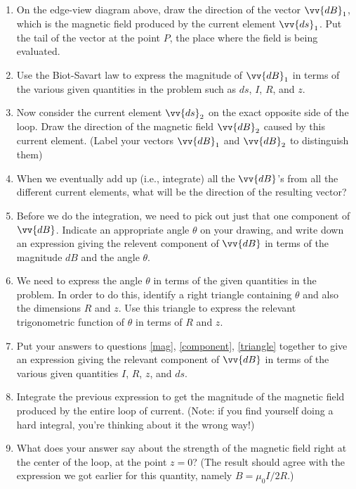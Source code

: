 \begin{enumerate}[wide, label=(\emph{\alph*})]
\item On the edge-view diagram above, draw the direction of the vector $\vv{dB}_1$,
which is the magnetic field produced by the current element $\vv{ds}_1$.  Put the
tail of the vector at the point $P$, the place where the field
is being evaluated.  

\item \label{mag}
Use the Biot-Savart law to express the magnitude of $\vv{dB}_1$
in terms of the various given quantities in the problem such as $ds$, $I$,
$R$, and $z$.
\answerspace{0.7in}

\item Now consider the current element $\vv{ds}_2$ on the exact opposite
side of the loop.  Draw the direction of the magnetic field $\vv{dB}_2$
caused by this current element.  (Label your vectors $\vv{dB}_1$ and $\vv{dB}_2$ 
to distinguish them)

\item When we eventually add up (i.e., integrate) all the $\vv{dB}$'s from
all the different current elements, what will be the direction of  
the resulting
vector?
\answerspace{0.5in}

\item \label{component}
Before we do the integration, we need to pick out just that
one component of $\vv{dB}$.  Indicate an appropriate angle $\theta$
on your drawing, and write down an expression giving the
relevent component of $\vv{dB}$ in terms of the magnitude
$dB$ and the angle $\theta$.
\answerspace{0.5in}

\item \label{triangle}
We need to express the angle $\theta$ in terms of the given
quantities in the problem.  In order to do this, identify a right
triangle containing $\theta$ and also the dimensions $R$ and $z$.  Use this triangle
to express the relevant trigonometric function of $\theta$
in terms of $R$ and $z$.  
\answerspace{0.5in}

\item Put your answers to questions \ref{mag}, \ref{component},
\ref{triangle} together
to give an expression giving the relevant component of $\vv{dB}$
in terms of the various given quantities $I$, $R$, $z$, and $ds$.
\answerspace{0.5in}

\item \label{answer1}
Integrate the previous expression to get the magnitude of the
magnetic field produced by the entire loop of current.  (Note: if you
find yourself doing a hard integral, you're thinking about it the wrong
way!)
\answerspace{1in}

\item What does your answer say about the strength of the magnetic
field right at the center of the loop, at the point $z=0$?
(The result should agree with the expression we got earlier for 
this quantity, namely $B=\mu_0I/2R$.)
\answerspace{0.5in}

\end{enumerate}

